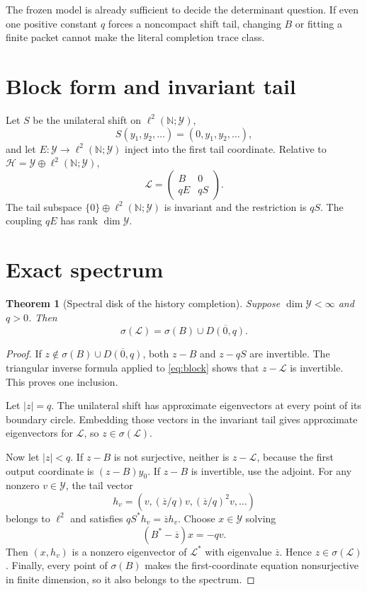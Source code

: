 \documentclass[12pt]{article}
\newtheorem{theorem}{Theorem}[section]
\theoremstyle{remark}
\newcommand{\cY}{\mathcal Y}
\newcommand{\cH}{\mathcal H}
\begin{document}
The frozen model is already sufficient to decide the determinant question.
If even one positive constant $q$ forces a noncompact shift tail, changing
$B$ or fitting a finite packet cannot make the literal completion trace
class.

\section{Block form and invariant tail}

Let $S$ be the unilateral shift on $\ell^2(\mathbb N;\cY)$,
\[
 S(y_1,y_2,\ldots)=(0,y_1,y_2,\ldots),
\]
and let $E:\cY\to\ell^2(\mathbb N;\cY)$ inject into the first tail
coordinate.  Relative to
$\cH=\cY\oplus\ell^2(\mathbb N;\cY)$,
\begin{equation}\label{eq:block}
 \mathcal L=
 \begin{pmatrix}
 B&0\\
 qE&qS
 \end{pmatrix}.
\end{equation}
The tail subspace $\{0\}\oplus\ell^2(\mathbb N;\cY)$ is invariant and the
restriction is $qS$.  The coupling $qE$ has rank $\dim\cY$.

\section{Exact spectrum}

\begin{theorem}[Spectral disk of the history completion]\label{thm:spectrum}
Suppose $\dim\cY<\infty$ and $q>0$.  Then
\begin{equation}\label{eq:spectrum}
 \sigma(\mathcal L)=\sigma(B)\cup\overline{D(0,q)}.
\end{equation}
\end{theorem}

\begin{proof}
If $z\notin\sigma(B)\cup\overline{D(0,q)}$, both $z-B$ and $z-qS$ are
invertible.  The triangular inverse formula applied to \eqref{eq:block}
shows that $z-\mathcal L$ is invertible.  This proves one inclusion.

Let $|z|=q$.  The unilateral shift has approximate eigenvectors at every
point of its boundary circle.  Embedding those vectors in the invariant tail
gives approximate eigenvectors for $\mathcal L$, so
$z\in\sigma(\mathcal L)$.

Now let $|z|<q$.  If $z-B$ is not surjective, neither is
$z-\mathcal L$, because the first output coordinate is $(z-B)y_0$.
If $z-B$ is invertible, use the adjoint.  For any nonzero $v\in\cY$, the
tail vector
\[
 h_v=(v,(\overline z/q)v,(\overline z/q)^2v,\ldots)
\]
belongs to $\ell^2$ and satisfies $qS^*h_v=\overline z h_v$.  Choose
$x\in\cY$ solving
\[
 (B^*-\overline z)x=-qv.
\]
Then $(x,h_v)$ is a nonzero eigenvector of $\mathcal L^*$ with eigenvalue
$\overline z$.  Hence $z\in\sigma(\mathcal L)$.  Finally, every point of
$\sigma(B)$ makes the first-coordinate equation nonsurjective in finite
dimension, so it also belongs to the spectrum.
\end{proof}
\end{document}
